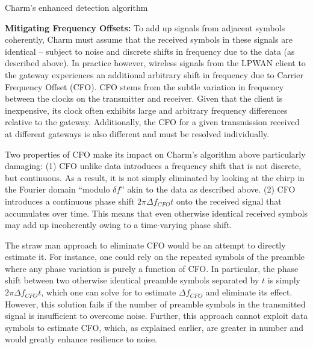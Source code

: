 \LinesNumbered
\begin{algorithm}[ht]
\caption{Charm's enhanced detection algorithm}
\label{alg:algorithm-label2}
\end{algorithm}

\noindent \textbf{Mitigating Frequency Offsets: } To add up signals from
adjacent symbols coherently, Charm must assume that the received symbols in
these signals are identical -- subject to noise and discrete shifts in
frequency due to the data (as described above). In practice however, wireless
signals from the LPWAN client to the gateway experiences an additional
arbitrary shift in frequency due to Carrier Frequency Offset (CFO). CFO stems
from the subtle variation in frequency between the clocks on the transmitter
and receiver. Given that the client is inexpensive, its clock often exhibits
large and arbitrary frequency differences relative to the gateway.
Additionally, the CFO for a given transmission received at different gateways
is also different and must be resolved individually.

Two properties of CFO make its impact on Charm's algorithm above particularly
damaging: (1) CFO unlike data introduces a frequency shift that is not
discrete, but continuous. As a result, it is not simply eliminated by looking at
the chirp in the Fourier domain ``modulo $\delta f$''  akin to the data as
described above. (2) CFO introduces a continuous phase shift $2 \pi
\Delta f_{CFO} t$ onto the received signal that accumulates over time. This
means that even otherwise identical received symbols may add up incoherently
owing to a time-varying phase shift.

The straw man approach to eliminate CFO would be an attempt to directly
estimate it. For instance, one could rely on the repeated symbols of the
preamble where any phase variation is purely a function of CFO. In particular,
the phase shift between two otherwise identical preamble symbols separated by
$t$ is simply $2 \pi \Delta f_{CFO} t$, which one can solve for to estimate $\Delta
f_{CFO}$ and eliminate its effect. However, this solution fails if the number of preamble symbols in the transmitted signal is insufficient to overcome noise. Further, this approach cannot exploit data symbols to estimate CFO, which, as explained earlier, are greater in number and would greatly enhance resilience to noise.

